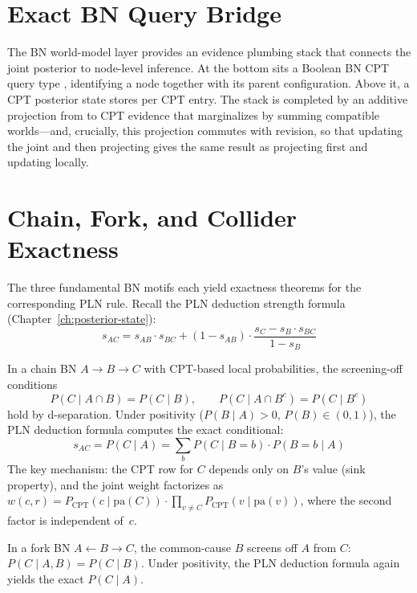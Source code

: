 \documentclass[11pt,openany]{report}
\begin{document}
\section{Exact BN Query Bridge}

The BN world-model layer provides an evidence plumbing stack that
connects the joint posterior to node-level inference.  At the bottom sits
a Boolean BN CPT query type , identifying a node together
with its parent configuration.  Above it, a CPT posterior state
 stores \Evidence{} per CPT entry.  The stack is completed
by an additive projection from \JointEvidence{} to CPT evidence that
marginalizes by summing compatible worlds---and, crucially, this
projection commutes with revision, so that updating the joint and then
projecting gives the same result as projecting first and updating locally.

\section{Chain, Fork, and Collider Exactness}
\label{sec:chain-fork-collider}

The three fundamental BN motifs each yield exactness theorems for the
corresponding PLN rule.  Recall the PLN deduction strength formula
(Chapter~\ref{ch:posterior-state}):
\[
  s_{AC} = s_{AB} \cdot s_{BC} + (1 - s_{AB}) \cdot
  \frac{s_C - s_B \cdot s_{BC}}{1 - s_B}
\]

\begin{theorem}
\label{thm:chain-exact}
In a chain BN $A \to B \to C$ with CPT-based local probabilities,
the screening-off conditions
\[
  P(C \mid A \cap B) = P(C \mid B), \qquad
  P(C \mid A \cap B^c) = P(C \mid B^c)
\]
hold by d-separation.  Under positivity ($P(B \mid A) > 0$, $P(B) \in (0,1)$),
the PLN deduction formula computes the exact conditional:
\[
  s_{AC} = P(C \mid A) = \sum_b P(C \mid B=b) \cdot P(B=b \mid A)
\]
The key mechanism: the CPT row for $C$ depends only on $B$'s value
(sink property), and the joint weight factorizes as
$w(c, r) = P_{\mathrm{CPT}}(c \mid \mathrm{pa}(C)) \cdot
\prod_{v \ne C} P_{\mathrm{CPT}}(v \mid \mathrm{pa}(v))$,
where the second factor is independent of~$c$.
\end{theorem}

\begin{theorem}
\label{thm:fork-exact}
In a fork BN $A \leftarrow B \to C$, the common-cause $B$ screens off
$A$ from $C$: $P(C \mid A, B) = P(C \mid B)$.  Under positivity, the
PLN deduction formula again yields the exact $P(C \mid A)$.
\end{theorem}
\end{document}
